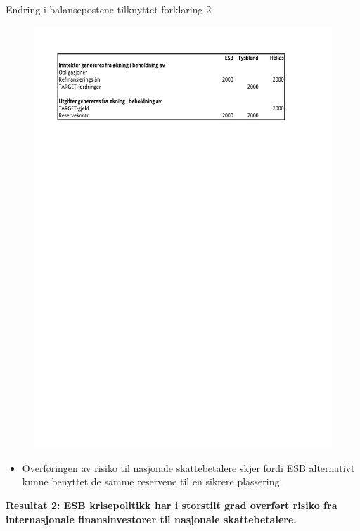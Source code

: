 \documentclass[notes=show notes]{beamer}
\begin{document}
\begin{frame}{Endring i balansepostene tilknyttet forklaring 2}
\begin{figure}
\centering
\includegraphics[width=0.9\linewidth]{SenFork2-1}
\caption{}
\label{fig:SenFork2}
\end{figure}
\end{frame}
\begin{frame}
\begin{itemize}
\item Overf\o ringen av risiko til nasjonale skattebetalere skjer fordi ESB alternativt kunne benyttet de samme reservene til en sikrere plassering.
\end{itemize}
\end{frame}
\begin{frame}
\textbf{Resultat 2: ESB krisepolitikk har i storstilt grad overf\o rt risiko fra internasjonale finansinvestorer til nasjonale skattebetalere.}
\end{frame}
\end{document}
